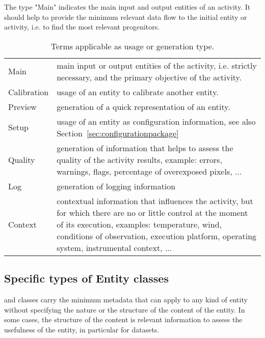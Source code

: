The type "Main" indicates the main input and output entities of an activity. It should help to provide the minimum relevant data flow to the initial entity or activity, i.e. to find the most relevant progenitors.

\begin{table}[ht]
\small
{}\textwidth
\begin{tabulary}{1.0\textwidth}{Lp{9cm}}
\toprule
{} &  \\
\midrule
Main           & main input or output entities of the activity, i.e. strictly necessary, and the primary objective of the activity.\\
Calibration    & usage of an entity to calibrate another entity.\\
Preview        & generation of a quick representation of an entity.\\
Setup          & usage of an entity as configuration information, see also Section~\ref{sec:configurationpackage}\\
Quality        & generation of information that helps to assess the quality of the activity results, example: errors, warnings, flags, percentage of overexposed pixels, ...\\
Log            & generation of logging information \\
Context        & contextual information that influences the activity, but for which there are no or little control at the moment of its execution, examples: temperature, wind, conditions of observation, execution platform, operating system, instrumental context, ...\\
\bottomrule
\end{tabulary}
\caption[Terms applicable as usage or generation type.]{Terms applicable as usage or generation type.}
\label{tab:usage-generation-types}
\end{table}



\subsection{Specific types of Entity classes}
\label{sec:spec_entities}

 and  classes carry the minimum metadata that can apply to any kind of entity without specifying the nature or the structure of the content of the entity. 
In some cases, the structure of the content is relevant information to assess the usefulness of the entity, in particular for datasets.

